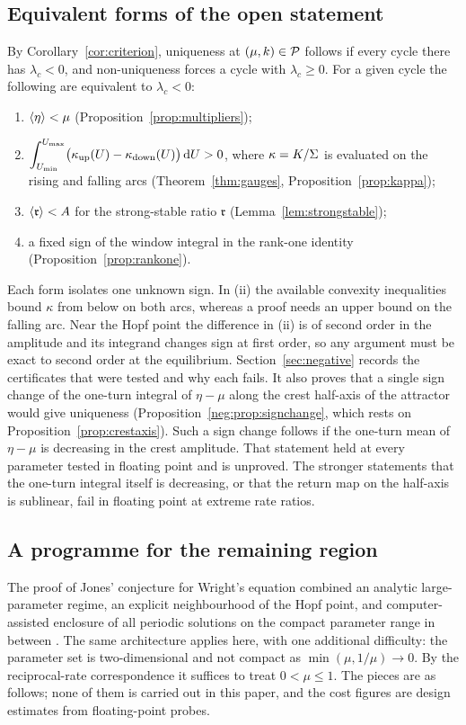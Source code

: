 \subsection{Equivalent forms of the open statement}
By Corollary~\ref{cor:criterion}, uniqueness at $(\mu,k)\in\mathcal P$ follows if every cycle there has $\lambda_c<0$, and non-uniqueness forces a cycle with $\lambda_c\ge0$. For a given cycle the following are equivalent to $\lambda_c<0$:
\begin{enumerate}[label=(\roman*)]
\item $\left\langle \eta\right\rangle<\mu$ (Proposition~\ref{prop:multipliers});
\item $\displaystyle\int_{U_{\min}}^{U_{\max}}\bigl(\kappa_{\rm up}(U)-\kappa_{\rm down}(U)\bigr)\,\mathrm dU>0$, where $\kappa=K/\Sigma$ is evaluated on the rising and falling arcs (Theorem~\ref{thm:gauges}, Proposition~\ref{prop:kappa});
\item $\left\langle \mathfrak r\right\rangle<A$ for the strong-stable ratio $\mathfrak r$ (Lemma~\ref{lem:strongstable});
\item a fixed sign of the window integral in the rank-one identity (Proposition~\ref{prop:rankone}).
\end{enumerate}
Each form isolates one unknown sign. In (ii) the available convexity inequalities bound $\kappa$ from below on both arcs, whereas a proof needs an upper bound on the falling arc. Near the Hopf point the difference in (ii) is of second order in the amplitude and its integrand changes sign at first order, so any argument must be exact to second order at the equilibrium. Section~\ref{sec:negative} records the certificates that were tested and why each fails. It also proves that a single sign change of the one-turn integral of $\eta-\mu$ along the crest half-axis of the attractor would give uniqueness (Proposition~\ref{neg:prop:signchange}, which rests on Proposition~\ref{prop:crestaxis}). Such a sign change follows if the one-turn mean of $\eta-\mu$ is decreasing in the crest amplitude. That statement held at every parameter tested in floating point and is unproved. The stronger statements that the one-turn integral itself is decreasing, or that the return map on the half-axis is sublinear, fail in floating point at extreme rate ratios.

\subsection{A programme for the remaining region}
The proof of Jones' conjecture for Wright's equation combined an analytic large-parameter regime, an explicit neighbourhood of the Hopf point, and computer-assisted enclosure of all periodic solutions on the compact parameter range in between \cite{Xie93,JLM17,vdBJ18,Jaquette19}. The same architecture applies here, with one additional difficulty: the parameter set is two-dimensional and not compact as $\min(\mu,1/\mu)\to0$. By the reciprocal-rate correspondence it suffices to treat $0<\mu\le1$. The pieces are as follows; none of them is carried out in this paper, and the cost figures are design estimates from floating-point probes.

